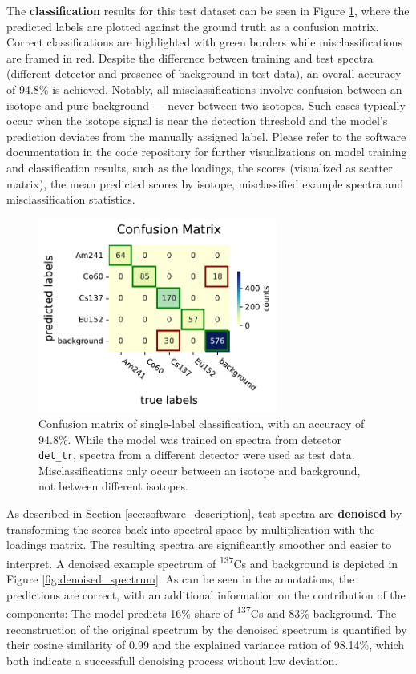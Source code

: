 \documentclass[preprint,12pt, a4paper]{elsarticle}
\begin{document}
The \textbf{classification} results for this test dataset can be seen in Figure \ref{fig:confusion_matrix}, where the predicted labels are plotted against the ground truth as a confusion matrix. Correct classifications are highlighted with green borders while misclassifications are framed in red. Despite the difference between training and test spectra (different detector and presence of background in test data), an overall accuracy of 94.8\% is achieved. Notably, all misclassifications involve confusion between an isotope and pure background — never between two isotopes. Such cases typically occur when the isotope signal is near the detection threshold and the model's prediction deviates from the manually assigned label. Please refer to the software documentation in the code repository for further visualizations on model training and classification results, such as the loadings, the scores (visualized as scatter matrix), the mean predicted scores by isotope, misclassified example spectra and misclassification statistics. \\

\begin{figure}
\centering
\includegraphics[width=0.7\textwidth]{Confusion_matrix_.pdf}
\caption{Confusion matrix of single-label classification, with an accuracy of 94.8\%. While the model was trained on spectra from detector \texttt{det\_tr}, spectra from a different detector were used as test data. Misclassifications only occur between an isotope and background, not between different isotopes.}
\label{fig:confusion_matrix}
\end{figure}

As described in Section \ref{sec:software_description}, test spectra are \textbf{denoised} by transforming the scores back into spectral space by multiplication with the loadings matrix. The resulting spectra are significantly smoother and easier to interpret. A denoised example spectrum of \textsuperscript{137}Cs and background is depicted in Figure \ref{fig:denoised_spectrum}. As can be seen in the annotations, the predictions are correct, with an additional information on the contribution of the components: The model predicts 16\% share of \textsuperscript{137}Cs and 83\% background. The reconstruction of the original spectrum by the denoised spectrum is quantified by their cosine similarity of 0.99 and the explained variance ration of 98.14\%, which both indicate a successfull denoising process without low deviation. 
\end{document}
